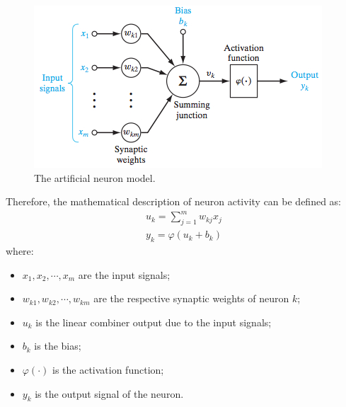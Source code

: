 \begin{figure}[t]
\centering
\includegraphics[width=0.8\linewidth]{img/NeuronModel.jpg}
\caption{The artificial neuron model.}
\end{figure}

Therefore, the mathematical description of neuron activity can be defined as:
\begin{eqnarray}
{ u }_{ k }=\sum _{ j=1 }^{ m }{ { w }_{ kj } } { x }_{ j }\\ 
{ y }_{ k }=\varphi \left( { u }_{ k }+b_{ k } \right)
\end{eqnarray}
where:
\begin{itemize}
\item ${ x }_{ 1 },{ x }_{ 2 },\cdots ,{ x }_{ m }$ are the input signals;
\item ${ w }_{ k1 },{ w }_{ k2 },\cdots ,{ w }_{ km }$ are the respective synaptic weights of neuron $k$;
\item $u_k$ is the linear combiner output due to the input signals;
\item $b_k$ is the bias;
\item $\varphi(\cdot)$ is the activation function;
\item $y_k$ is the output signal of the neuron.
\end{itemize}

